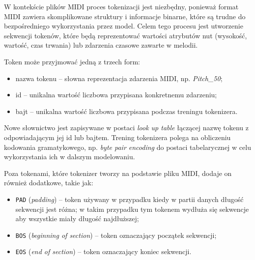 \documentclass[data-science]{agh-wi} %
\begin{document}
W kontekście plików MIDI proces tokenizacji jest niezbędny, ponieważ format MIDI zawiera skomplikowane struktury i informacje binarne, które są trudne do bezpośredniego wykorzystania przez model. Celem tego procesu jest utworzenie sekwencji tokenów, które będą reprezentować wartości atrybutów nut (wysokość, wartość, czas trwania) lub zdarzenia czasowe zawarte w melodii.

Token może przyjmować jedną z trzech form:
\begin{itemize}
    \item nazwa tokenu -- słowna reprezentacja zdarzenia MIDI, np. \textit{Pitch\_50};
    \item id -- unikalna wartość liczbowa przypisana konkretnemu zdarzeniu;
    \item bajt -- unikalna wartość liczbowa przypisana podczas treningu tokenizera.
\end{itemize}

Nowe słownictwo jest zapisywane w postaci \textit{look up table} łączącej nazwę tokenu z odpowiadającym jej id lub bajtem. Trening tokenizera polega na obliczeniu kodowania gramatykowego, np. \textit{byte pair encoding} do postaci tabelarycznej w celu wykorzystania ich w dalszym modelowaniu.

Poza tokenami, które tokenizer tworzy na podstawie pliku MIDI, dodaje on również dodatkowe, takie jak:
\begin{itemize}
    \item \texttt{PAD} (\textit{padding}) -- token używany w przypadku kiedy w partii danych długość sekwencji jest różna; w takim przypadku tym tokenem wydłuża się sekwencje aby wszystkie miały długość najdłuższej;
    \item \texttt{BOS} (\textit{beginning of section}) -- token oznaczający początek sekwencji;
    \item \texttt{EOS} (\textit{end of section}) -- token oznaczający koniec sekwencji.
\end{itemize}
\end{document}

